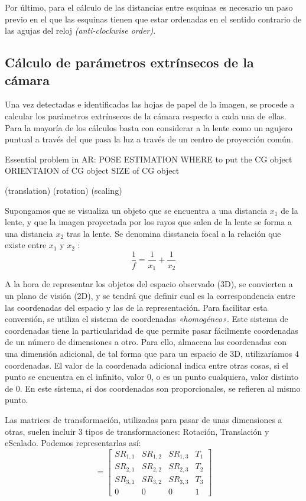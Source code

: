 Por último, para el cálculo de las distancias entre esquinas es necesario un paso previo
en el que las esquinas tienen que estar ordenadas en el sentido contrario de las agujas del reloj
\textit{(anti-clockwise order)}.

\subsection{Cálculo de parámetros extrínsecos de la cámara}
Una vez detectadas e identificadas las hojas de papel de la imagen, se procede a calcular los parámetros extrínsecos de la cámara respecto a cada una de ellas. Para la mayoría de los cálculos basta con considerar a la lente como un agujero puntual a través del que pasa la luz a través de un centro de proyección común.

Essential problem in AR: POSE ESTIMATION
WHERE to put the CG object
ORIENTAION of CG object
SIZE of CG object

(translation)
(rotation)
(scaling)

Supongamos que se visualiza un objeto que se encuentra a una distancia $x_{1}$ de la lente, y que la
imagen proyectada por los rayos que salen de la lente se forma a una distancia $x_{2}$ tras la
lente. Se denomina disstancia focal a la relación que existe entre $x_{1}$ y $x_{2}$ :
\begin{equation}
\dfrac{1}{f} = \dfrac{1}{x_{1}} + \dfrac{1}{x_{2}}
\end{equation}

A la hora de representar los objetos del espacio observado (3D), se convierten a un plano de
visión (2D), y se tendrá que definir cual es la correspondencia entre las coordenadas del espacio y las de la representación. Para facilitar esta conversión, se utiliza el sistema de coordenadas \emph{«homogéneo»}. Este sistema de coordenadas tiene la particularidad de que permite pasar fácilmente coordenadas de un número de dimensiones a otro. Para ello, almacena las coordenadas con una dimensión adicional, de tal forma que para un espacio de 3D, utilizaríamos 4 coordenadas. El valor de la coordenada adicional indica entre otras cosas, si el punto se encuentra en el infinito, valor 0, o es un punto cualquiera, valor distinto de 0. En este sistema, si dos coordenadas son proporcionales, se refieren al mismo punto.

Las matrices de transformación, utilizadas para pasar de unas dimensiones a otras, suelen incluir 3 tipos de transformaciones: Rotación, Translación y eScalado. Podemos representarlas así:
\begin{equation}
  [R|t] = \begin{bmatrix} SR_{1,1} & SR_{1,2} & SR_{1,3} & T_{1}  \\
                          SR_{2,1} & SR_{2,2} & SR_{2,3} & T_{2}  \\
                          SR_{3,1} & SR_{3,2} & SR_{3,3} & T_{3}  \\
                             0    &     0    &     0    &  1
  \end{bmatrix}
\end{equation}

